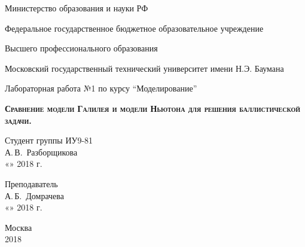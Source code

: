 \documentclass[14pt,russian]{extarticle}
\newcommand{\enq}[1]{\enquote{#1}}
\begin{document}
\sloppy

\def\figurename{Рисунок}

\begin{titlepage}
\thispagestyle{empty}
\newpage

\centerline{Министерство образования и науки РФ}
\centerline{Федеральное государственное бюджетное образовательное учреждение }
\centerline{Высшего профессионального образования}
\medskip 
\medskip 
\medskip
\centerline{Московский государственный технический университет имени Н.Э. Баумана}
 
\vspace{8em}
 
\begin{center}
\Large Лабораторная работа №1 по курсу \enq{Моделирование} \\
\end{center}
 
\begin{center}
\textsc{\textbf{Сравнение модели Галилея и модели Ньютона для решения баллистической задачи.}}
\end{center}
 
\vspace{\fill}
 

\newlength{\ML}

\hfill\begin{minipage}{0.5\textwidth}
  Студент группы ИУ9-81\\
  \underline{\hspace{\ML}} А.\,В.~Разборщикова\\
  «\underline{\hspace{0.7cm}}» \underline{\hspace{2cm}} 2018 г.
\end{minipage}%
\bigskip

\hfill\begin{minipage}{0.5\textwidth}
  Преподаватель\\
  \underline{\hspace{\ML}} А.\,Б.~Домрачева\\
  «\underline{\hspace{0.7cm}}» \underline{\hspace{2cm}} 2018 г.
\end{minipage}%
\vfill

 


\begin{center}
Москва \\2018
\end{center}
\end{titlepage}
\end{document}

